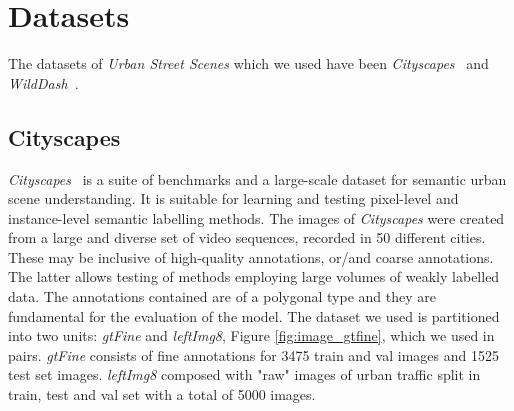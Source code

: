 \documentclass[10pt,twocolumn,letterpaper]{article}
\begin{document}
\section{Datasets}
The datasets of \textit{Urban Street Scenes} which we used have been \textit{Cityscapes}~\cite{cityscapes} and \textit{WildDash}~\cite{wildDash}.
\subsection{Cityscapes}
\textit{Cityscapes}~\cite{cityscapes} is a suite of benchmarks and a large-scale dataset for semantic urban scene understanding. It is suitable for learning and testing pixel-level and instance-level semantic labelling methods. The images of \textit{Cityscapes} were created from a large and diverse set of video sequences, recorded in 50 different cities. These may be inclusive of high-quality annotations, or/and coarse annotations. The latter allows testing of methods employing large volumes of weakly labelled data. The annotations contained are of a polygonal type and they are fundamental for the evaluation of the model.
The dataset we used is partitioned into two units: \textit{gtFine} and \textit{leftImg8}, Figure \ref{fig:image_gtfine}, which we used in pairs. \textit{gtFine} consists of fine annotations for 3475 train and val images and 1525 test set images.
\textit{leftImg8} composed with "raw" images of urban traffic split in train, test and val set with a total of 5000 images.
\end{document}
